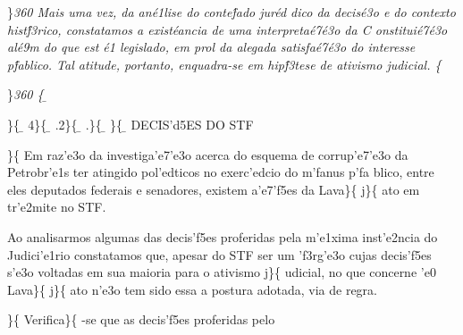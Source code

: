 \par \}\pard \ltrpar\qj {}\sl360\widctlpar\wrapdefault\aspalpha\aspnum\faauto\adjustright{} {\rtlch{}  \ltrch{}  Mais uma vez, da an\'e1lise do conte\'fado jur\'ed
dico da decis\'e3o e do contexto hist\'f3rico, constatamos a exist\'eancia de uma interpreta\'e7\'e3o da }{\rtlch{}  \ltrch{}  C}{\rtlch{}  \ltrch{}  onstitui\'e7\'e3o al\'e9m do que est
\'e1 legislado, em prol da alegada satisfa\'e7\'e3o do interesse p\'fablico. Tal atitude, portanto, enquadra-se em hip\'f3tese de ativismo judicial. }\{\rtlch{}
 \ltrch{} 
\par \}\pard \ltrpar\qj {}\sl360\widctlpar\wrapdefault\aspalpha\aspnum\faauto\adjustright{} \{\rtlch{}
\ab{} \ltrch{} \b{} \par \}\{\rtlch{}
\ab{} \ltrch{} \b{}
4\}\{\rtlch{} \ab{} \ltrch{}
\b{} .2\}\{\rtlch{} \ab{}
\ltrch{} \b{} .\}\{\rtlch{} \ab{}
\ltrch{} \b{} \}\{\rtlch{}
\ab{} \ltrch{} \b{}
DECIS'd5ES DO STF \par \}\{\rtlch{}  \ltrch{}
 \tab Em raz'e3o da investiga'e7'e3o
acerca do esquema de corrup'e7'e3o da Petrobr'e1s ter atingido
pol'edticos no exerc'edcio do m'fanus p'fa blico, entre eles deputados
federais e senadores, existem a'e7'f5es da Lava\}\{\rtlch{} 
\ltrch{}  j\}\{\rtlch{}  \ltrch{}
 ato em tr'e2mite no STF. \par \tab Ao
analisarmos algumas das decis'f5es proferidas pela m'e1xima inst'e2ncia
do Judici'e1rio constatamos que, apesar do STF ser um 'f3rg'e3o cujas
decis'f5es s'e3o voltadas em sua maioria para o ativismo
j\}\{\rtlch{}  \ltrch{}  udicial, no que
concerne 'e0 Lava\}\{\rtlch{}  \ltrch{} 
j\}\{\rtlch{}  \ltrch{}  ato
n'e3o tem sido essa a postura adotada, via de regra.
\par \tab \}\{\rtlch{}  \ltrch{} 
Verifica\}\{\rtlch{}  \ltrch{}
 -se que as decis'f5es proferidas pelo
